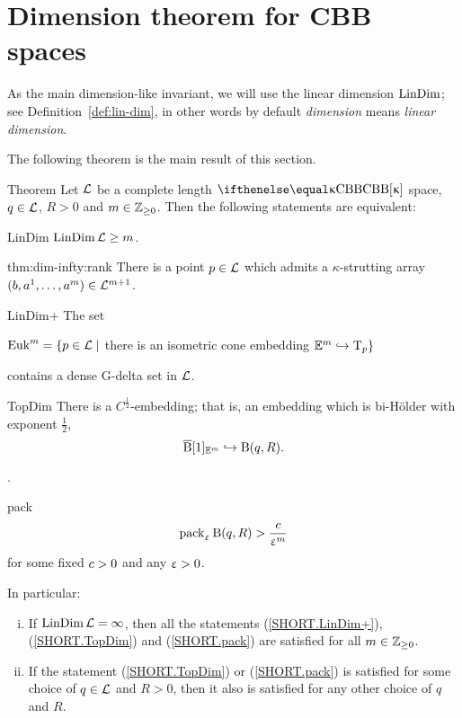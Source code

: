 \section{Dimension theorem for CBB %
spaces}\label{sec:dim>m}

As the main dimension-like invariant, we will use  the linear dimension $\mathop{\rm LinDim}\nolimits$; 
see Definition~\ref{def:lin-dim}, in other words by default \emph{dimension} means \emph{linear dimension}. 


The following theorem is the main result of this section.


\begin{thm}{Theorem}\label{thm:dim-infty}
Let $\mathcal{L}$ be a complete length $\Alex{\kappa}$ space, 
$q\in \spc{L}$, 
$R>0$ 
and $m\in \ZZ_{\ge0}$.
Then the following statements are equivalent:
\begin{subthmA}{LinDim}  $\LinDim\spc{L}\ge m$.
\end{subthmA}

\begin{subthmA}{thm:dim-infty:rank}
There is a point $p\in\spc{L}$ which admits a $\kappa$-strutting array $(b,a^1,\dots,a^m)\in\spc{L}^{m+1}$.
\end{subthmA}

\begin{subthmA}{LinDim+} The set 
\begin{center}
$\Euk^m=\{p\in \spc{L}\mid$ there is an isometric cone embedding $\EE^m\hookrightarrow \T_p\}$            \end{center} 
\noi contains a dense G-delta set in $\mathcal{L}$.
\end{subthmA}

\begin{subthmA}{TopDim} There is a $C^{\frac{1}{2}}$-embedding; that is, an embedding which is bi-H\"older with exponent $\tfrac{1}{2}$,
\[\cBall[1]_{\EE^m}\hookrightarrow \oBall(q,R).\]
\end{subthmA}.

\begin{subthmA}{pack} 
\[\mathop{\rm pack}\nolimits_\upvarepsilon \mathrm{B}{}(q,R)>\frac{c}{\upvarepsilon^m}\]
for some fixed $c>0$ and any $\upvarepsilon>0$.
\end{subthmA}

\medskip

In particular:
\begin{enumerate}[(i)]
\item If $\mathop{\rm LinDim}\nolimits\mathcal{L}=\infty$, then all the statements (\ref{SHORT.LinDim+}), (\ref{SHORT.TopDim}) and (\ref{SHORT.pack}) are satisfied for all $m\in\ZZ_{\ge0}$. 
\item 
 If the statement (\ref{SHORT.TopDim}) or (\ref{SHORT.pack}) is satisfied for some choice of $q\in \spc{L}$ and $R>0$, then it also is satisfied for any other choice of $q$ and $R$.
\end{enumerate}
\end{thm}

